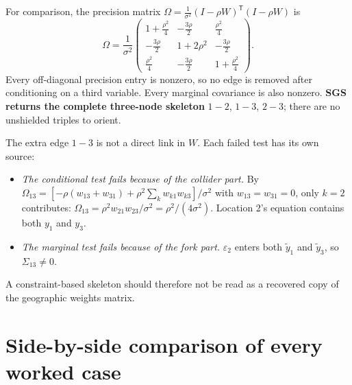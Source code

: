 \documentclass[11pt,a4paper]{article}
\newcommand{\yt}{\widetilde y}
\begin{document}
For comparison, the precision matrix $\Omega=\frac{1}{\sigma^2}(I-\rho W)^{\mathsf T}(I-\rho W)$ is
\begin{equation}
\Omega=\frac1{\sigma^2}\begin{pmatrix}
1+\tfrac{\rho^2}{4}&-\tfrac{3\rho}{2}&\tfrac{\rho^2}{4}\\
-\tfrac{3\rho}{2}&1+2\rho^2&-\tfrac{3\rho}{2}\\
\tfrac{\rho^2}{4}&-\tfrac{3\rho}{2}&1+\tfrac{\rho^2}{4}
\end{pmatrix}.\label{eq:symprec}
\end{equation}
Every off-diagonal precision entry is nonzero, so no edge is removed after conditioning on a third variable. Every marginal covariance is also nonzero. \textbf{SGS returns the complete three-node skeleton} $1-2$, $1-3$, $2-3$; there are no unshielded triples to orient.

The extra edge $1-3$ is not a direct link in $W$. Each failed test has its own source:
\begin{itemize}
\item \emph{The conditional test fails because of the collider part.} By $\Omega_{13}=[-\rho(w_{13}+w_{31})+\rho^2\sum_kw_{k1}w_{k3}]/\sigma^2$ with $w_{13}=w_{31}=0$, only $k=2$ contributes: $\Omega_{13}=\rho^2w_{21}w_{23}/\sigma^2=\rho^2/(4\sigma^2)$. Location 2's equation contains both $y_1$ and $y_3$.
\item \emph{The marginal test fails because of the fork part.} $\varepsilon_2$ enters both $\yt_1$ and $\yt_3$, so $\Sigma_{13}\ne0$.
\end{itemize}
A constraint-based skeleton should therefore not be read as a recovered copy of the geographic weights matrix.

\section{Side-by-side comparison of every worked case}
\end{document}
